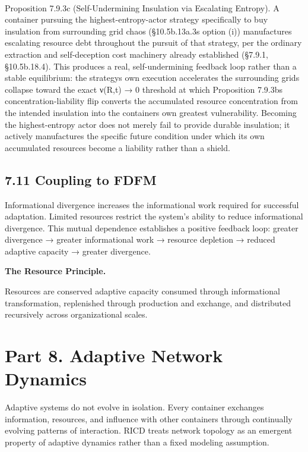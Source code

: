 \documentclass[
]{article}
\begin{document}
\strut \\
Proposition 7.9.3c (Self-Undermining Insulation via Escalating Entropy).
A container pursuing the highest-entropy-actor strategy specifically to
buy insulation from surrounding grid chaos
(§10.5b.13a.3\textquotesingle s option (i)) manufactures escalating
resource debt throughout the pursuit of that strategy, per the ordinary
extraction and self-deception cost machinery already established
(§7.9.1, §10.5b.18.4). This produces a real, self-undermining feedback
loop rather than a stable equilibrium: the strategy\textquotesingle s
own execution accelerates the surrounding grid\textquotesingle s
collapse toward the exact ν(R,t) → 0 threshold at which Proposition
7.9.3b\textquotesingle s concentration-liability flip converts the
accumulated resource concentration from the intended insulation into the
container\textquotesingle s own greatest vulnerability. Becoming the
highest-entropy actor does not merely fail to provide durable
insulation; it actively manufactures the specific future condition under
which its own accumulated resources become a liability rather than a
shield.

\hypertarget{coupling-to-fdfm}{%
\subsection{7.11 Coupling to FDFM}\label{coupling-to-fdfm}}

Informational divergence increases the informational work required for
successful adaptation. Limited resources restrict the system's ability
to reduce informational divergence. This mutual dependence establishes a
positive feedback loop: greater divergence → greater informational work
→ resource depletion → reduced adaptive capacity → greater divergence.

\textbf{The Resource Principle.}

Resources are conserved adaptive capacity consumed through informational
transformation, replenished through production and exchange, and
distributed recursively across organizational scales.

\hypertarget{part-8.-adaptive-network-dynamics}{%
\section{Part 8. Adaptive Network
Dynamics}\label{part-8.-adaptive-network-dynamics}}

Adaptive systems do not evolve in isolation. Every container exchanges
information, resources, and influence with other containers through
continually evolving patterns of interaction. RICD treats network
topology as an emergent property of adaptive dynamics rather than a
fixed modeling assumption.
\end{document}
